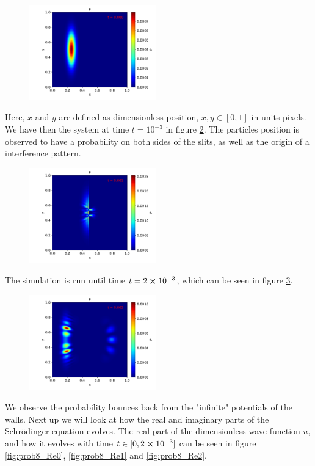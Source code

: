 \documentclass[english,notitlepage,reprint,nofootinbib]{revtex4-2}  %
\begin{document}
	\begin{figure}[H]
		\centering
		\includegraphics[clip,width=0.49\textwidth]{figures/problem8_P_0.000.pdf}
		\caption{}
		\label{fig:prob_P0}
	\end{figure}
	Here, $x$ and $y$ are defined as dimensionless position, $x, y\in[0, 1]$ in units pixels. We have then the system at time $t = 10^{-3}$ in figure \ref{fig:prob8_P1}. The particles position is observed to have a probability on both sides of the slits, as well as the origin of a interference pattern.

	\begin{figure}[H]
		\centering
		\includegraphics[clip,width=0.49\textwidth]{figures/problem8_P_0.001.pdf}
		\caption{}
		\label{fig:prob8_P1}
	\end{figure}
	The simulation is run until time $t=2\cross10^{-3}$, which can be seen in figure \ref{fig:prob8_P2}.

	\begin{figure}[H]
		\centering
		\includegraphics[clip,width=0.49\textwidth]{figures/problem8_P_0.002.pdf}
		\caption{}
		\label{fig:prob8_P2}
	\end{figure}
	We observe the probability bounces back from the "infinite" potentials of the walls. Next up we will look at how the real and imaginary parts of the Schrödinger equation evolves. The real part of the dimensionless wave function $u$, and how it evolves with time $t \in[0, 2\cross10^{-3}]$ can be seen in figure \ref{fig:prob8_Re0}, \ref{fig:prob8_Re1} and \ref{fig:prob8_Re2}.
\end{document}
